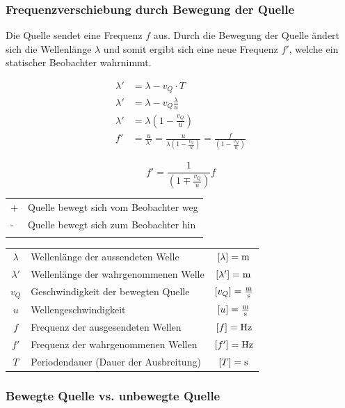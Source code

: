 \subsubsection{Frequenzverschiebung durch Bewegung der Quelle}

Die Quelle sendet eine Frequenz $f$ aus. Durch die Bewegung der Quelle ändert sich die Wellenlänge $\lambda$ und somit ergibt sich eine neue Frequenz $f'$, welche ein statischer Beobachter wahrnimmt. 

\begin{align*}
\lambda' &= \lambda -v_Q \cdot T  \\
\lambda'&= \lambda -v_Q \frac{\lambda}{u}\\
\lambda' &= \lambda (1 - \frac{v_Q}{u})  \\
f'&= \frac{u}{\lambda'} = \frac{u}{\lambda(1-\frac{v_Q}{u})} = \frac{f}{(1-\frac{v_Q}{u})}
\end{align*}


$$ \boxed{f' = \frac{1}{(1 \mp \frac{v_Q}{u})}f}$$


\begin{tabular}{ll}
+ & Quelle bewegt sich vom Beobachter weg \\
- & Quelle bewegt sich zum Beobachter hin\\
\\
\end{tabular}


\begin{tabular}{clc}
$\lambda$ & Wellenlänge der aussendeten Welle & $[\lambda] = \mathrm{m}$ \\
$\lambda'$ & Wellenlänge der wahrgenommenen Welle & $[\lambda'] = \mathrm{m}$ \\
$v_Q$ & Geschwindigkeit der bewegten Quelle & $[v_Q] = \frac{\mathrm{m}}{\mathrm{s}}$ \\
$u$ & Wellengeschwindigkeit & $[u] = \frac{\mathrm{m}}{\mathrm{s}}$ \\
$f$ & Frequenz der ausgesendeten Wellen & $[f] = \mathrm{Hz}$ \\
$f'$ & Frequenz der wahrgenommenen Wellen & $[f'] = \mathrm{Hz}$ \\
$T$ & Periodendauer (Dauer der Ausbreitung) & $[T] = \mathrm{s}$ \\
\end{tabular}




\subsubsection{Bewegte Quelle vs. unbewegte Quelle}

